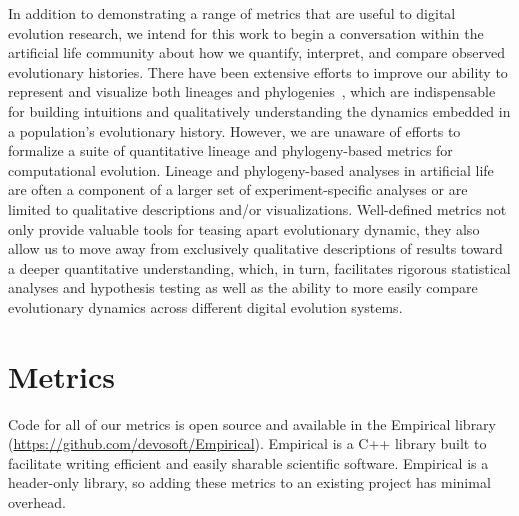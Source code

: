 \documentclass[letterpaper]{article}
\begin{document}
In addition to demonstrating a range of metrics that are %
useful to digital evolution research, we intend for this work to begin a conversation within the %
artificial life community about how we quantify, interpret, and compare observed evolutionary histories. There have been extensive efforts to improve our ability to represent and visualize both lineages and phylogenies~\citep{standish_visualising_2002,burlacu_visualization_2013, mcphee_using_2016,mcphee_visualizing_2016, lalejini_evolutionary_2016}, which are indispensable for building intuitions and qualitatively understanding the dynamics embedded in a population's evolutionary history. However, we are unaware of efforts to formalize a suite of quantitative lineage and phylogeny-based metrics for computational evolution. %
Lineage and phylogeny-based analyses in artificial life are often a component of a larger set of experiment-specific analyses or are limited to qualitative descriptions and/or visualizations. 
Well-defined metrics not only provide valuable tools for teasing apart evolutionary dynamic, they also allow us to move away from exclusively qualitative descriptions of results toward a deeper quantitative understanding, which, in turn, facilitates rigorous statistical analyses and hypothesis testing as well as the ability to more easily compare evolutionary dynamics across different digital evolution systems.

\section{Metrics}

Code for all of our metrics is open source and available in the Empirical library (\url{https://github.com/devosoft/Empirical}). Empirical is a C++ library built to facilitate writing efficient and easily sharable scientific software. %
Empirical is a header-only library, so adding these metrics to an existing project has minimal overhead.
\end{document}
